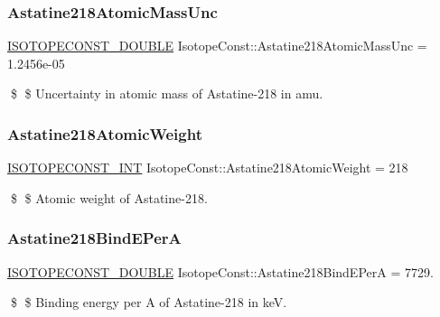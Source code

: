\subsubsection{\texorpdfstring{Astatine218\+Atomic\+Mass\+Unc}{Astatine218AtomicMassUnc}}
{\footnotesize\ttfamily \mbox{\hyperlink{group___isotope_const-_macros_ga8f45a7272ce02c0b4c65c44636ed719a}{I\+S\+O\+T\+O\+P\+E\+C\+O\+N\+S\+T\+\_\+\+D\+O\+U\+B\+LE}} Isotope\+Const\+::\+Astatine218\+Atomic\+Mass\+Unc = 1.\+2456e-\/05}

\$ \$ Uncertainty in atomic mass of Astatine-\/218 in amu. \mbox{\label{group___isotope_const-_astatine-_at218_ga4b0c1763ce44fc10819ae51dc417a250}} 
\subsubsection{\texorpdfstring{Astatine218\+Atomic\+Weight}{Astatine218AtomicWeight}}
{\footnotesize\ttfamily \mbox{\hyperlink{group___isotope_const-_macros_ga5f18360b3e99483a35c32d789e62621c}{I\+S\+O\+T\+O\+P\+E\+C\+O\+N\+S\+T\+\_\+\+I\+NT}} Isotope\+Const\+::\+Astatine218\+Atomic\+Weight = 218}

\$ \$ Atomic weight of Astatine-\/218. \mbox{\label{group___isotope_const-_astatine-_at218_gaff2a1c539cde7c67ae74e17564ac9131}} 
\subsubsection{\texorpdfstring{Astatine218\+Bind\+E\+PerA}{Astatine218BindEPerA}}
{\footnotesize\ttfamily \mbox{\hyperlink{group___isotope_const-_macros_ga8f45a7272ce02c0b4c65c44636ed719a}{I\+S\+O\+T\+O\+P\+E\+C\+O\+N\+S\+T\+\_\+\+D\+O\+U\+B\+LE}} Isotope\+Const\+::\+Astatine218\+Bind\+E\+PerA = 7729.}

\$ \$ Binding energy per A of Astatine-\/218 in keV. \mbox{\label{group___isotope_const-_astatine-_at218_gac527df2aeb6d6e1bc96ea44997f2560e}} 
